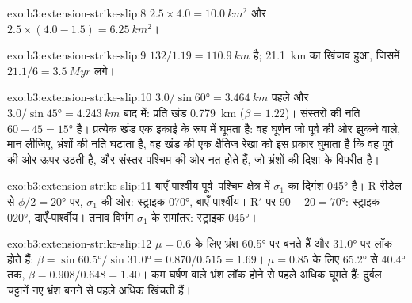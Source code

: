 \begin{solution}{exo:b3:extension-strike-slip:8}
$2.5\times4.0 = \qty{10.0}{km^2}$ और $2.5\times(4.0 - 1.5) =
\qty{6.25}{km^2}$।
\end{solution}

\begin{solution}{exo:b3:extension-strike-slip:9}
$132/1.19 = \qty{110.9}{km}$ है; \qty{21.1}{km} का खिंचाव हुआ,
जिसमें $21.1/6 = \qty{3.5}{Myr}$ लगे।
\end{solution}

\begin{solution}{exo:b3:extension-strike-slip:10}
$3.0/\sin\ang{60} = \qty{3.464}{km}$ पहले और $3.0/\sin\ang{45} =
\qty{4.243}{km}$ बाद में: प्रति खंड \qty{0.779}{km} ($\beta = 1.22$)। संस्तरों की
नति $60 - 45 = \ang{15}$ है। प्रत्येक खंड एक इकाई के रूप में घूमता है: वह घूर्णन जो
पूर्व की ओर झुकने वाले, मान लीजिए, भ्रंशों की नति घटाता है, वह खंड की एक क्षैतिज रेखा को
इस प्रकार घुमाता है कि वह पूर्व की ओर ऊपर उठती है, और संस्तर पश्चिम की ओर नत होते हैं,
जो भ्रंशों की दिशा के विपरीत है।
\end{solution}

\begin{solution}{exo:b3:extension-strike-slip:11}
बाएँ-पार्श्वीय पूर्व--पश्चिम क्षेत्र में $\sigma_1$ का दिगंश \ang{045} है। R रीडेल  से $\phi/2 = \ang{20}$ पर, $\sigma_1$ की ओर: स्ट्राइक \ang{070},
बाएँ-पार्श्वीय। R$'$ पर $90 - 20 = \ang{70}$: स्ट्राइक \ang{020}, दाएँ-पार्श्वीय। तनाव
विभंग $\sigma_1$ के समांतर: स्ट्राइक \ang{045}।
\end{solution}

\begin{solution}{exo:b3:extension-strike-slip:12}
$\mu = 0.6$ के लिए भ्रंश \ang{60.5} पर बनते हैं और \ang{31.0} पर लॉक होते हैं: $\beta =
\sin\ang{60.5}/\sin\ang{31.0} = 0.870/0.515 = 1.69$। $\mu = 0.85$ के लिए
\ang{65.2} से \ang{40.4} तक, $\beta = 0.908/0.648 = 1.40$। कम घर्षण वाले
भ्रंश लॉक होने से पहले अधिक घूमते हैं: दुर्बल चट्टानें नए
भ्रंश बनने से पहले अधिक खिंचती हैं।
\end{solution}

